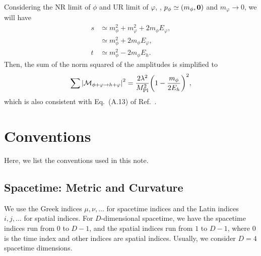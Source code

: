 \documentclass{article}
\begin{document}
            Considering the NR limit of $\phi$ and UR limit of $\varphi$, \ie, $p_\phi \simeq \qty(m_\phi, \vb{0})$ and $m_\varphi \to 0$, we will have
            \begin{equation}
                \begin{aligned}
                    s & \simeq m_\phi^2 + m_\varphi^2 + 2 m_\phi E_\varphi, \\
                    & \simeq m_\phi^2 + 2 m_\phi E_\varphi, \\
                    t & \simeq m_\phi^2 - 2 m_\phi E_h.
                \end{aligned}
            \end{equation}
            Then, the sum of the norm squared of the amplitudes is simplified to
            \begin{equation}
                \sumMsqr[\phi + \varphi \to h + \varphi] = \frac{2 \lambda^2}{\MPl^2} \qty(1 - \frac{m_\phi}{2 E_h})^2,
            \end{equation}
            which is also consistent with Eq.~(A.13) of Ref.~\cite{Xu:2024fjl}.


    \clearpage
    \appendix

    \section{Conventions}\label{app:convention}

        Here, we list the conventions used in this note.

        \subsection{Spacetime: Metric and Curvature}
        
            We use the Greek indices $\mu, \nu, \ldots$ for spacetime indices and the Latin indices $i, j, \ldots$ for spatial indices.
            For $D$-dimensional spacetime, we have the spacetime indices run from $0$ to $D - 1$, and the spatial indices run from $1$ to $D - 1$, where $0$ is the time index and other indices are spatial indices.
            Usually, we consider $D = 4$ spacetime dimensions.
\end{document}
